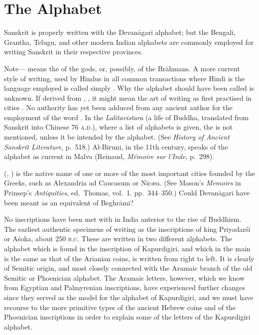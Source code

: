 \def\DevnagVersion{2.17}%
\chapter{The Alphabet}

\s Sanskrit is properly written with the Devanāgarī alphabet; but the
Bengali, %
Grantha, %
%
Telugu, and other modern Indian alphabets are commonly employed for
writing Sanskrit in their respective provinces.

\begin{note}
  Note— means the  of the gods, or, possibly,
  of the Brāhmans. A more current style of writing, used by Hindus in
  all common transactions where Hindi is the language employed is called
  simply . Why the alphabet should have been called
   is unknown. If derived from , , it
  might mean the art of writing as first practised in cities
  . No authority has yet been adduced from any ancient
  author for the employment of the word . In the
  \emph{Lalitavistara} (a life of Buddha, translated from Sanskrit into
  Chinese 76 \textsc{a.d.}), where a list of alphabets is given, the
   is not mentioned, unless it be intended by the
   alphabet. (See \emph{History of Ancient Sanskrit
    Literature}, p.\ 518.) Al-Biruni, in the 11th century, speaks of the
   alphabet as current in Malva (Reinaud, \emph{Mémoire sur
    l'Inde}, p.\ 298).

   (, ) is the native
  name of one or more of the most important cities founded by the
  Greeks, such as Alexandria ad Caucasum or Nicæa. (See Mason's
  \emph{Memoirs} in Prinsep's \emph{Antiquities}, ed.\ Thomas, vol.\ 1.
  pp.\ 344–350.) Could Devanāgarī have been meant as an equivalent of
  Beghrāmi?

  No inscriptions have been met with in India anterior to the rise of
  Buddhism. The earliest authentic specimens of writing as the
  inscriptions of king Priyadarśi or Aśoka, about 250 \textsc{b.c}.
  These are written in two different alphabets. The alphabet which is
  found in the inscription of Kapurdigiri, and which in the main is the
  same as that of the Arianian coins, is written from right to left. It
  is clearly of Semitic origin, and most closely connected with the
  Aramaic branch of the old Semitic or Phoenician alphabet. The Aramaic
  letters, however, which we know from Egyptian and Palmyrenian
  inscriptions, have experienced further changes since they served as
  the model for the alphabet of Kapurdigiri, and we must have recourse
  to the more primitive types of the ancient Hebrew coins and of the
  Phoenician inscriptions in order to explain some of the letters of the
  Kapurdigiri alphabet.


\end{note}
